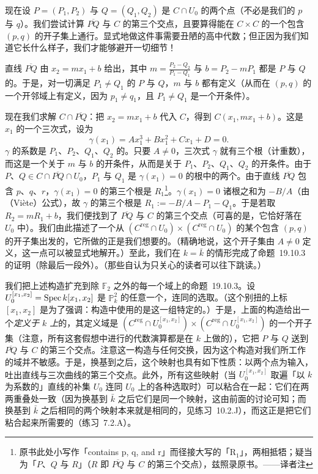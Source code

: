 现在设 $P=(P_1,P_2)$ 与 $Q=(Q_1,Q_2)$ 是 $C\cap U_0$ 的两个点（不必是我们的 $p$ 与 $q$）。我们尝试计算 $\overline{PQ}$ 与 $C$ 的第三个交点，且要算得能在 $C\times C$ 的一个包含 $(p,q)$ 的开子集上通行。显式地做这件事需要丑陋的高中代数；但正因为我们知道它长什么样子，我们才能够避开一切细节！

直线 $\overline{PQ}$ 由 $x_2=mx_1+b$ 给出，其中 $m=\frac{P_2-Q_2}{P_1-Q_1}$ 与 $b=P_2-mP_1$ 都是 $P$ 与 $Q$ 的\trRationalFunction。于是，对一切满足 $P_1\ne Q_1$ 的 $P$ 与 $Q$，$m$ 与 $b$ 都有定义（从而在 $(p,q)$ 的一个开邻域上有定义，因为 $p_1\ne q_1$，且 $P_1\ne Q_1$ 是一个开条件）。

现在我们求解 $C\cap\overline{PQ}$：把 $x_2=mx_1+b$ 代入 $C$，得到 $C(x_1,mx_1+b)$。这是 $x_1$ 的一个三次式，设为
\[
\gamma(x_1)=Ax_1^3+Bx_1^2+Cx_1+D=0.
\]
$\gamma$ 的系数是 $P_1$、$P_2$、$Q_1$、$Q_2$ 的\trRationalFunction。只要 $A\ne 0$，三次式 $\gamma$ 就有三个根（计重数），而这是一个关于 $m$ 与 $b$ 的\trZariski{}开条件，从而是关于 $P_1$、$P_2$、$Q_1$、$Q_2$ 的\trZariski{}开条件。由于 $P$、$Q\in C\cap\overline{PQ}\cap U_0$，$P_1$ 与 $Q_1$ 是 $\gamma(x_1)=0$ 的根中的两个。由于直线 $\overline{PQ}$ 包含 $p$、$q$、$r$，$\gamma(x_1)=0$ 的第三个根是 $R_1$\footnote{原书此处小写作「contains p, q, and r」而径接大写的「R$_1$」，两相抵牾；疑当为「$P$、$Q$ 与 $R$」（$R$ 即 $\overline{PQ}$ 与 $C$ 的第三个交点），兹照录原书。——译者注}。$\gamma(x_1)=0$ 诸根之和为 $-B/A$（由\trViete{}（Vi\`ete）公式），故 $\gamma$ 的第三个根是 $R_1:=-B/A-P_1-Q_1$。于是若取 $R_2=mR_1+b$，我们便找到了 $\overline{PQ}$ 与 $C$ 的第三个交点（可喜的是，它恰好落在 $U_0$ 中）。我们由此描述了一个从 $(C^{\mathrm{reg}}\cap U_0)\times(C^{\mathrm{reg}}\cap U_0)$ 的某个包含 $(p,q)$ 的开子集出发的\trMorphism，它所做的正是我们想要的。（精确地说，这个开子集由 $A\ne 0$ 定义，这一点可以被显式地解开。）至此，我们在 $k=\bar{k}$ 的情形完成了\mbox{命题~19.10.3} 的证明（除最后一段外）。（那些自认为只关心\trAlgClosedField{}的读者可以往下跳读。）

我们把上述构造扩充到除 $\mathbb{F}_2$ 之外的每一个域上的\mbox{命题~19.10.3}。设 $U_0^{[x_1,x_2]}=\operatorname{Spec} k[x_1,x_2]$ 是 $\mathbb{P}^2_k$ 的任意一个\trAffine\trOpenSubset，连同\trCoordinate{}的选取。（这个别扭的上标 $[x_1,x_2]$ 是为了强调：构造中使用的是这一组特定的\trCoordinate。）于是，上面的构造给出一个\emph{定义于 $k$ 上}的\trMorphism，其定义域是 $(C^{\mathrm{reg}}\cap U_0^{[x_1,x_2]})\times(C^{\mathrm{reg}}\cap U_0^{[x_1,x_2]})$ 的一个开子集（注意，所有这套假想中进行的代数演算都是在 $k$ 上做的），它把 $P$ 与 $Q$ 送到 $\overline{PQ}$ 与 $C$ 的第三个交点。注意这一构造与任何\trFieldExtension{}交换，因为这个构造对我们所工作的域并不敏感。于是，换基到\trAlgebraicClosure{}之后，这个映射也具有如下性质：以两个点为输入，吐出直线与三次曲线的第三个交点。此外，所有这些映射（当 $U_0^{[x_1,x_2]}$ 取遍「以 $k$ 为系数的」直线的补集 $U_0$ 连同 $U_0$ 上\trCoordinate{}的各种选取时）可以粘合在一起：它们在两两重叠处一致（因为换基到 $\bar{k}$ 之后它们是同一个映射，这由前面的讨论可知；而换基到 $\bar{k}$ 之后相同的两个映射本来就是相同的，见\mbox{练习~10.2.J}），而这正是把它们粘合起来所需要的（\mbox{练习~7.2.A}）。

